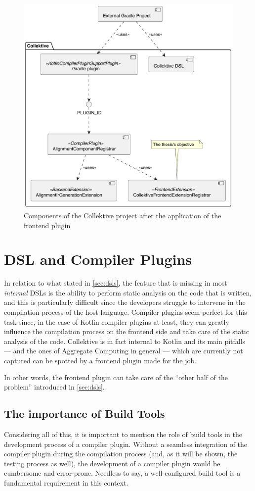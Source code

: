 \documentclass[12pt,a4paper,openright,twoside]{book}
\begin{document}
\begin{figure}
  \centering
  \includegraphics[width=.6\linewidth]{figures/collektive-components.pdf}
  \caption{Components of the Collektive project after the application of the frontend plugin}
  \label{fig:collektive-components-diagram}
\end{figure}

\section{DSL and Compiler Plugins}

In relation to what stated in \cref{sec:dsls}, the feature that is missing in
most \emph{internal} DSLs is the ability to perform static analysis on the code
that is written, and this is particularly difficult since the developers
struggle to intervene in the compilation process of the host language.
%
Compiler plugins seem perfect for this task since, in the case of Kotlin
compiler plugins at least, they can greatly influence the compilation process on
the frontend side and take care of the static analysis of the code. Collektive
is in fact internal to Kotlin and its main pitfalls --- and the ones of
Aggregate Computing in general --- which are currently not captured can be
spotted by a frontend plugin made for the job. 

In other words, the frontend plugin can take care of the ``other half of the 
problem'' introduced in \cref{sec:dsls}.

\subsection{The importance of Build Tools}

Considering all of this, it is important to mention the role of build tools in
the development process of a compiler plugin. Without a seamless integration of
the compiler plugin during the compilation process (and, as it will be shown,
the testing process as well), the development of a compiler plugin would be
cumbersome and error-prone. 
%
Needless to say, a well-configured build tool is a fundamental requirement in
this context.
\end{document}
